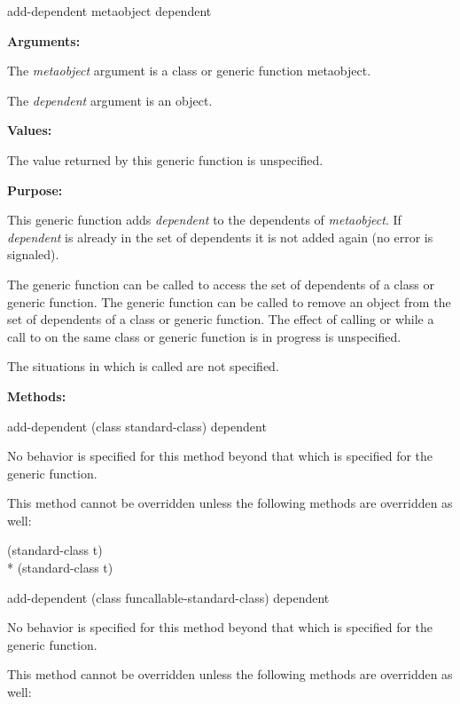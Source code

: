 \begin{defun}
add-dependent metaobject dependent

\textbf{Arguments:}

The \emph{metaobject} argument is a class or generic function metaobject.

The \emph{dependent} argument is an object.

\textbf{Values:}

The value returned by this generic function is unspecified.

\textbf{Purpose:}

This generic function adds \emph{dependent} to the dependents of \emph{metaobject}. If
\emph{dependent} is already in the set of dependents it is not added again (no error is
signaled).

The generic function  can be called to access the set of
dependents of a class or generic function. The generic function 
can be called to remove an object from the set of dependents of a class or
generic function. The effect of calling  or  while
a call to  on the same class or generic function is in progress is
unspecified. 

The situations in which  is called are not specified.

\textbf{Methods:}

\begin{defun}
add-dependent (class standard-class) dependent

No behavior is specified for this method beyond that which is specified for the
generic function.

This method cannot be overridden unless the following methods are overridden as
well:

\begin{tabbing}
     (standard-class t) \\*
     (standard-class t) 
\end{tabbing}
\end{defun}
  
\begin{defun}
add-dependent (class funcallable-standard-class) dependent

No behavior is specified for this method beyond that which is specified for the generic function.

This method cannot be overridden unless the following methods are overridden as well:


\end{defun}
\end{defun}
